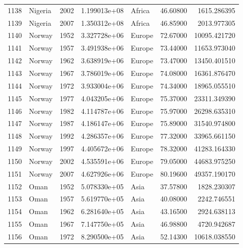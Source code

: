 \documentclass[
  letterpaper,
  DIV=11,
  numbers=noendperiod]{scrreprt}
\begin{document}
\begin{tabular}{llrrlrr}
1138 &                   Nigeria &  2002 &  1.199013e+08 &    Africa &  46.60800 &    1615.286395 \\
1139 &                   Nigeria &  2007 &  1.350312e+08 &    Africa &  46.85900 &    2013.977305 \\
1140 &                    Norway &  1952 &  3.327728e+06 &    Europe &  72.67000 &   10095.421720 \\
1141 &                    Norway &  1957 &  3.491938e+06 &    Europe &  73.44000 &   11653.973040 \\
1142 &                    Norway &  1962 &  3.638919e+06 &    Europe &  73.47000 &   13450.401510 \\
1143 &                    Norway &  1967 &  3.786019e+06 &    Europe &  74.08000 &   16361.876470 \\
1144 &                    Norway &  1972 &  3.933004e+06 &    Europe &  74.34000 &   18965.055510 \\
1145 &                    Norway &  1977 &  4.043205e+06 &    Europe &  75.37000 &   23311.349390 \\
1146 &                    Norway &  1982 &  4.114787e+06 &    Europe &  75.97000 &   26298.635310 \\
1147 &                    Norway &  1987 &  4.186147e+06 &    Europe &  75.89000 &   31540.974800 \\
1148 &                    Norway &  1992 &  4.286357e+06 &    Europe &  77.32000 &   33965.661150 \\
1149 &                    Norway &  1997 &  4.405672e+06 &    Europe &  78.32000 &   41283.164330 \\
1150 &                    Norway &  2002 &  4.535591e+06 &    Europe &  79.05000 &   44683.975250 \\
1151 &                    Norway &  2007 &  4.627926e+06 &    Europe &  80.19600 &   49357.190170 \\
1152 &                      Oman &  1952 &  5.078330e+05 &      Asia &  37.57800 &    1828.230307 \\
1153 &                      Oman &  1957 &  5.619770e+05 &      Asia &  40.08000 &    2242.746551 \\
1154 &                      Oman &  1962 &  6.281640e+05 &      Asia &  43.16500 &    2924.638113 \\
1155 &                      Oman &  1967 &  7.147750e+05 &      Asia &  46.98800 &    4720.942687 \\
1156 &                      Oman &  1972 &  8.290500e+05 &      Asia &  52.14300 &   10618.038550 \\

\end{tabular}
\end{document}
